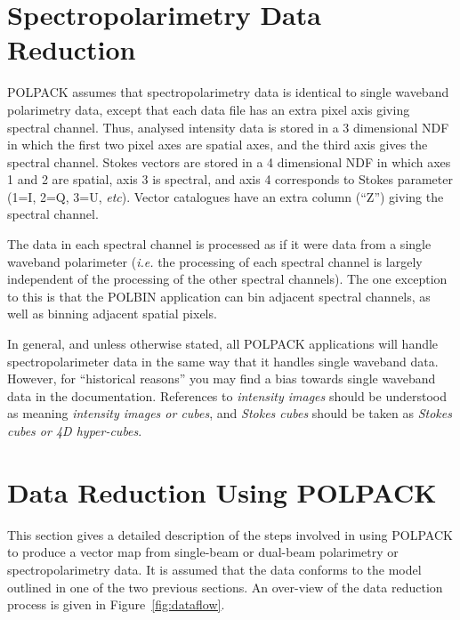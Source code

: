 \documentclass[twoside,11pt]{article}
\newcommand{\htmlref}[2]{#1}
\newcommand{\latex}[1]{#1}
\newcommand{\html}[1]{}
\newcommand{\xlabel}[1]{}
\renewcommand{\_}{\texttt{\symbol{95}}}
\begin{document}
\section{\label{SEC:SPEC}\xlabel{spectropolarimetrydatareduction}Spectropolarimetry
Data Reduction}
POLPACK assumes that spectropolarimetry data is identical to single
waveband polarimetry data, except that each data file has an extra pixel
axis giving spectral channel. Thus, analysed intensity data is stored in a
3 dimensional NDF in which the first two pixel axes are spatial axes, and the
third axis gives the spectral channel. Stokes vectors are stored in a 4
dimensional NDF in which axes 1 and 2 are spatial, axis 3 is spectral, and
axis 4 corresponds to Stokes parameter (1=I, 2=Q, 3=U, \emph{etc}).
Vector catalogues have an extra column (``Z'') giving the spectral channel.

The data in each spectral channel is processed as if it were data from a
single waveband polarimeter (\emph{i.e.} the processing of each spectral
channel is largely independent of the processing of the other spectral
channels). The one exception to this is that the \htmlref{POLBIN}{POLBIN}
application can bin adjacent spectral channels, as well as binning
adjacent spatial pixels.

In general, and unless otherwise stated, all POLPACK applications will handle
spectropolarimeter data in the same way that it handles single waveband
data. However, for ``historical reasons'' you may find a bias towards single 
waveband data in the documentation. References to \emph{intensity images}
should be understood as meaning \emph{intensity images or cubes}, and 
\emph{Stokes cubes} should be taken as \emph{Stokes cubes or 4D
hyper-cubes}.

\section{\label{SEC:POLRED}\xlabel{datareductionusingpolpack}Data Reduction Using POLPACK}
This section gives a detailed description of the steps involved in using
POLPACK to produce a vector map from single-beam or dual-beam polarimetry
or spectropolarimetry data. It is assumed that the data conforms to the model outlined in one
of the two previous sections. An over-view of the data reduction process
is given in \latex{Figure~\ref{fig:dataflow}.} \html{the next figure:}
\end{document}
